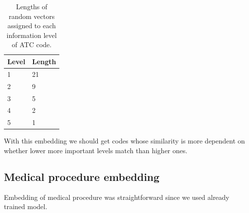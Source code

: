 \begin{table}[!h]
	\centering
	\begin{tabular}{|l|l|}
		\hline
		Level  & Length \\ \hline
		1 & 21 \\ \hline
		2 & 9 \\ \hline
		3 & 5 \\ \hline
		4 & 2 \\ \hline
		5 & 1 \\ \hline
	\end{tabular}
	\caption{Lengths of random vectors assigned to each information level of ATC code.}
	\label{tab:drug_lev_len}
\end{table}  

With this embedding we should get codes whose similarity is more dependent on whether lower more important levels match than higher ones.

\subsection{Medical procedure embedding}

Embedding of medical procedure was straightforward since we used already trained model. 
\\

